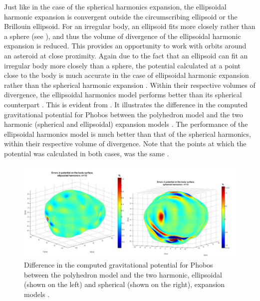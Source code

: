 Just like in the case of the spherical harmonics expansion, the ellipsoidal harmonic expansion is convergent outside the circumscribing ellipsoid or the Brillouin ellipsoid. For an irregular body, an ellipsoid fits more closely rather than a sphere (see ), and thus the volume of divergence of the ellipsoidal harmonic expansion is reduced. This provides an opportunity to work with orbits around an asteroid at close proximity. Again due to the fact that an ellipsoid can fit an irregular body more closely than a sphere, the potential calculated at a point close to the body is much accurate in the case of ellipsoidal harmonic expansion rather than the spherical harmonic expansion \cite{ellipse_main}. Within their respective volumes of divergence, the ellipsoidal harmonics model performs better than its spherical counterpart \cite{spherical_ellipsoidal_comparison}. This is evident from . It illustrates the difference in the computed gravitational potential for Phobos between the polyhedron model and the two harmonic (spherical and ellipsoidal) expansion models \cite{spherical_ellipsoidal_comparison}. The performance of the ellipsoidal harmonics model is much better than that of the spherical harmonics, within their respective volume of divergence. Note that the points at which the potential was calculated in both cases, was the same \cite{spherical_ellipsoidal_comparison}.
%
\begin{figure}[h]
\centering
\captionsetup{justification=centering}
\includegraphics[width=\textwidth]{surface_comparison_spherical_ellipsoidal.png}
\caption{Difference in the computed gravitational potential for Phobos between the polyhedron model and the two harmonic, ellipsoidal (shown on the left) and spherical (shown on the right), expansion models \cite{spherical_ellipsoidal_comparison}.}
\label{fig:surface_comparison_spherical_ellipsoidal}
\end{figure}

